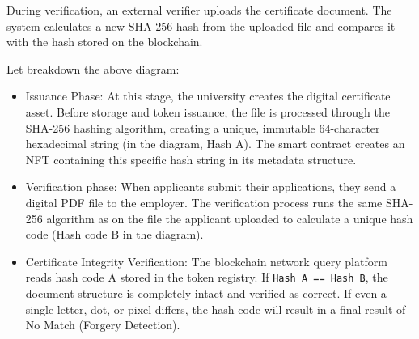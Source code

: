 During verification, an external verifier uploads the certificate document. The system calculates a new SHA-256 hash from the uploaded file and compares it with the hash stored on the blockchain.



Let breakdown the above diagram:
\begin{itemize}
    \item Issuance Phase: At this stage, the university creates the digital certificate asset. Before storage and token issuance, the file is processed through the SHA-256 hashing algorithm, creating a unique, immutable 64-character hexadecimal string (in the diagram, Hash A). The smart contract creates an NFT containing this specific hash string in its metadata structure.

    \item Verification phase: When applicants submit their applications, they send a digital PDF file to the employer. The verification process runs the same SHA-256 algorithm as on the file the applicant uploaded to calculate a unique hash code (Hash code B in the diagram).

    \item Certificate Integrity Verification: The blockchain network query platform reads hash code A stored in the token registry. If \texttt{Hash A == Hash B}, the document structure is completely intact and verified as correct. If even a single letter, dot, or pixel differs, the hash code will result in a final result of No Match (Forgery Detection).
\end{itemize}